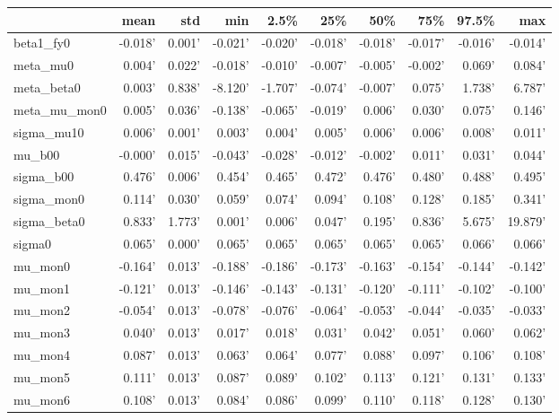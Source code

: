 \begin{tabular}{lrrrrrrrrr}
\toprule
{} &    mean &    std &     min &    2.5\% &     25\% &     50\% &     75\% &   97.5\% &     max \\
\midrule
beta1\_fy0    & -0.018' & 0.001' & -0.021' & -0.020' & -0.018' & -0.018' & -0.017' & -0.016' & -0.014' \\
meta\_mu0     &  0.004' & 0.022' & -0.018' & -0.010' & -0.007' & -0.005' & -0.002' &  0.069' &  0.084' \\
meta\_beta0   &  0.003' & 0.838' & -8.120' & -1.707' & -0.074' & -0.007' &  0.075' &  1.738' &  6.787' \\
meta\_mu\_mon0 &  0.005' & 0.036' & -0.138' & -0.065' & -0.019' &  0.006' &  0.030' &  0.075' &  0.146' \\
sigma\_mu10   &  0.006' & 0.001' &  0.003' &  0.004' &  0.005' &  0.006' &  0.006' &  0.008' &  0.011' \\
mu\_b00       & -0.000' & 0.015' & -0.043' & -0.028' & -0.012' & -0.002' &  0.011' &  0.031' &  0.044' \\
sigma\_b00    &  0.476' & 0.006' &  0.454' &  0.465' &  0.472' &  0.476' &  0.480' &  0.488' &  0.495' \\
sigma\_mon0   &  0.114' & 0.030' &  0.059' &  0.074' &  0.094' &  0.108' &  0.128' &  0.185' &  0.341' \\
sigma\_beta0  &  0.833' & 1.773' &  0.001' &  0.006' &  0.047' &  0.195' &  0.836' &  5.675' & 19.879' \\
sigma0       &  0.065' & 0.000' &  0.065' &  0.065' &  0.065' &  0.065' &  0.065' &  0.066' &  0.066' \\
mu\_mon0      & -0.164' & 0.013' & -0.188' & -0.186' & -0.173' & -0.163' & -0.154' & -0.144' & -0.142' \\
mu\_mon1      & -0.121' & 0.013' & -0.146' & -0.143' & -0.131' & -0.120' & -0.111' & -0.102' & -0.100' \\
mu\_mon2      & -0.054' & 0.013' & -0.078' & -0.076' & -0.064' & -0.053' & -0.044' & -0.035' & -0.033' \\
mu\_mon3      &  0.040' & 0.013' &  0.017' &  0.018' &  0.031' &  0.042' &  0.051' &  0.060' &  0.062' \\
mu\_mon4      &  0.087' & 0.013' &  0.063' &  0.064' &  0.077' &  0.088' &  0.097' &  0.106' &  0.108' \\
mu\_mon5      &  0.111' & 0.013' &  0.087' &  0.089' &  0.102' &  0.113' &  0.121' &  0.131' &  0.133' \\
mu\_mon6      &  0.108' & 0.013' &  0.084' &  0.086' &  0.099' &  0.110' &  0.118' &  0.128' &  0.130' \\

\end{tabular}
